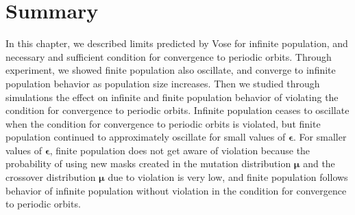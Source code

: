 \section{Summary}
In this chapter, we described limits predicted by Vose for infinite population, and necessary and sufficient condition 
for convergence to periodic orbits. Through experiment, we showed finite population also oscillate, 
and converge to infinite population behavior as population size increases. 
Then we studied through simulations the effect on infinite and finite population behavior of violating the condition 
for convergence to periodic orbits. Infinite population ceases to oscillate when the condition for convergence to 
periodic orbits is violated, but finite population continued to approximately oscillate for small values of $\bm{\epsilon}$. 
For smaller values of $\bm{\epsilon}$, finite population does not get aware of violation because the probability of using 
new masks created in the mutation distribution $\bm{\mu}$ and the crossover distribution $\bm{\mu}$ due to violation is very low, and 
finite population follows behavior of infinite population without violation in the condition for convergence to 
periodic orbits.





 
